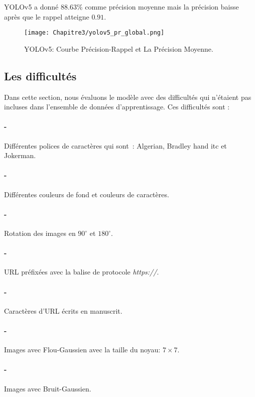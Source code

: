      YOLOv5 a donné $88.63\%$ comme précision moyenne mais la précision baisse après que le rappel atteigne $0.91$.
     \begin{figure}[H]
               \centering
               \texttt{[image: Chapitre3/yolov5\_pr\_global.png]}
               \caption{YOLOv5: Courbe Précision-Rappel et La Précision Moyenne.}
               \label{y5_pr}
               \end{figure}
     
     \subsection{Les difficultés}

          Dans cette section, nous évaluons le modèle avec des difficultés qui n'étaient pas incluses dans l'ensemble de données d'apprentissage. Ces difficultés sont :
          \paragraph{-} Différentes polices de caractères qui sont : Algerian, Bradley hand itc et Jokerman.
          \paragraph{-} Différentes couleurs de fond et couleurs de caractères.
          \paragraph{-} Rotation des images en $90^\circ$ et $180^\circ$.
          \paragraph{-} URL préfixées avec la balise de protocole \textit{https://}.
          \paragraph{-} Caractères d'URL écrits en manuscrit.
          \paragraph{-} Images avec Flou-Gaussien avec la taille du noyau: $7\times7$.
          \paragraph{-} Images avec Bruit-Gaussien.
          
